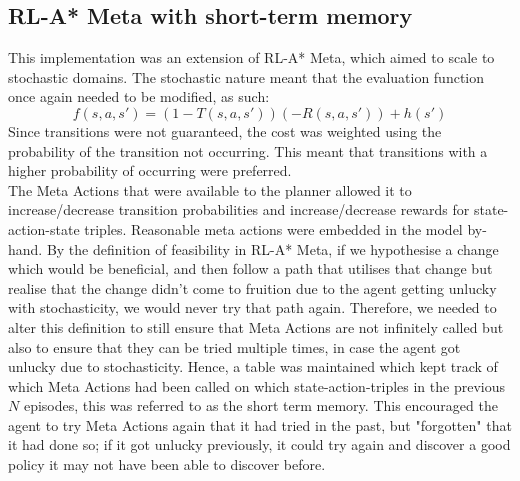 \subsection{RL-A* Meta with short-term memory}
\label{sec:342}
This implementation was an extension of RL-A* Meta, which aimed to scale to stochastic domains. The stochastic nature meant that the evaluation function once again needed to be modified, as such:
\begin{equation}
\label{eqn:astarevalsast}
f(s, a, s') = (1-T(s, a, s'))(-R(s,a, s')) + h(s')
\end{equation}
Since transitions were not guaranteed, the cost was weighted using the probability of the transition not occurring. This meant that transitions with a higher probability of occurring were preferred.
\\ The Meta Actions that were available to the planner allowed it to increase/decrease transition probabilities and increase/decrease rewards for state-action-state triples. Reasonable meta actions were embedded in the model by-hand. 
By the definition of feasibility in RL-A* Meta, if we hypothesise a change which would be beneficial, and then follow a path that utilises that change but realise that the change didn't come to fruition due to the agent getting unlucky with stochasticity, we would never try that path again. Therefore, we needed to alter this definition to still ensure that Meta Actions are not infinitely called but also to ensure that they can be tried multiple times, in case the agent got unlucky due to stochasticity. Hence, a table was maintained which kept track of which Meta Actions had been called on which state-action-triples in the previous $N$ episodes, this was referred to as the short term memory. This encouraged the agent to try Meta Actions again that it had tried in the past, but "forgotten" that it had done so; if it got unlucky previously, it could try again and discover a good policy it may not have been able to discover before.
